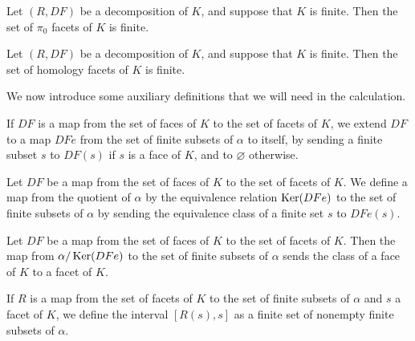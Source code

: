 \begin{sublemma}
Let $(R,DF)$ be a decomposition of $K$, and suppose that $K$ is finite. Then the set of $\pi_0$ facets of $K$ is finite.

\end{sublemma}

\begin{sublemma}
Let $(R,DF)$ be a decomposition of $K$, and suppose that $K$ is finite. Then the set of homology facets of $K$ is finite.

\end{sublemma}

We now introduce some auxiliary definitions that we will need in the calculation.

\begin{subdefi}[DFe]
If $DF$ is a map from the set of faces of $K$ to the set of facets of $K$, we extend $DF$ to a map $DFe$ from the set of finite
subsets of $\alpha$ to itself, by sending a finite subset $s$ to $DF(s)$ if $s$ is a face of $K$, and to $\varnothing$ otherwise.

\end{subdefi}

\begin{subdefi}
Let $DF$ be a map from the set of faces of $K$ to the set of facets of $K$. We define a map from the quotient of $\alpha$ by
the equivalence relation $\operatorname{Ker}(DFe)$ to the set of finite subsets of $\alpha$ by sending the equivalence class of a finite
set $s$ to $DFe(s)$.

\end{subdefi}

\begin{sublemma}
Let $DF$ be a map from the set of faces of $K$ to the set of facets of $K$. Then the map from $\alpha/\operatorname{Ker}(DFe)$ to the set of finite
subsets of $\alpha$ sends the class of a face of $K$ to a facet of $K$.

\end{sublemma}

\begin{subdefi}[DecompositionInterval']
If $R$ is a map from the set of facets of $K$ to the set of finite subsets of $\alpha$ and $s$ a facet of $K$, we define the
interval $[R(s),s]$ as a finite set of nonempty finite subsets of $\alpha$.

\end{subdefi}

